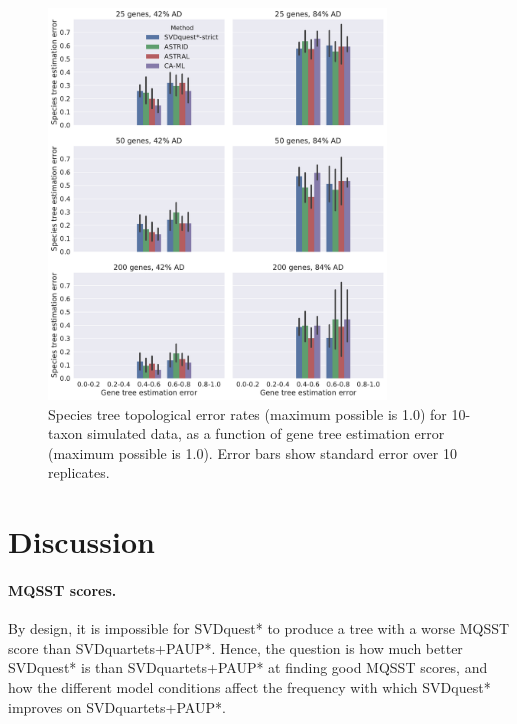 \begin{figure}
  \centering
  \includegraphics[width=0.8\textwidth]{svdquest-figs/concat_rfdists_10tax.pdf}
  \caption[Species tree topological error rates for 10-taxon simulated data as a function of gene tree estimation error]{Species tree topological error rates (maximum possible is 1.0) for 10-taxon simulated data, as a
    function of gene tree estimation error (maximum possible is 1.0). Error bars show standard
    error over 10 replicates.
    }
\label{svdquest::fig:exp3_10}\end{figure}


\clearpage
\section{Discussion}

\paragraph{MQSST scores. }
By design, it is impossible for SVDquest* to produce a tree with a
worse MQSST score than SVDquartets+PAUP*. Hence, the question is how much better
SVDquest* is than SVDquartets+PAUP* at finding good MQSST scores, and how the
different model conditions affect the frequency with which
SVDquest* improves on SVDquartets+PAUP*.


